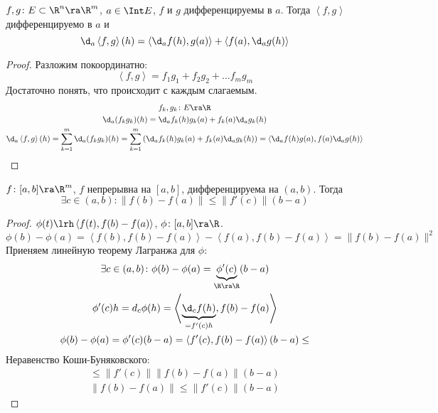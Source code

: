 \begin{theorem}
	$f, g\colon E \subset \R^n \ra \R^m$, $a \in \Int E$, $f$ и $g$ дифференцируемы в $a$.
	Тогда $\left<f, g\right>$ дифференцируемо в $a$ и
	\[ \d_a \left<f, g\right>(h) = \left<\d_a f(h), g(a)\right> + \left<f(a), \d_a g(h)\right>\]
\end{theorem}
\begin{proof}
	Разложим покоординатно:
	\[ \left<f, g\right> = f_1 g_1 + f_2 g_2 + \dots f_m g_m \]
	Достаточно понять, что происходит с каждым слагаемым.
	\begin{gather*}
		f_k, g_k\colon E \ra \R \\
		\d_a (f_k g_k)(h) = \d_a f_k(h) g_k(a) + f_k(a) \d_a g_k(h) \\
		\d_a \left<f, g\right>(h) = \sum_{k=1}^m \d_a (f_k g_k)(h) = \sum_{k=1}^m \left(\d_a f_k(h) g_k(a) + f_k(a) \d_a g_k(h)\right) =
			\left<\d_a f(h) g(a), f(a) \d_a g(h)\right>
	\end{gather*}
\end{proof}

\begin{theorem}
	$f\colon [a, b] \ra \R^m$, $f$ непрерывна на $[a, b]$, дифференцируема на $(a, b)$.
	Тогда
	\[ \exists c \in (a, b)\colon \|f(b) - f(a)\| \le \|f'(c)\| (b - a) \]
\end{theorem}
\begin{proof}
	$\phi(t) \lrh \left< f(t), f(b) - f(a) \right>$, $\phi\colon [a, b] \ra \R$.
	\[ \phi(b) - \phi(a) = \left< f(b), f(b) - f(a) \right> - \left< f(a), f(b) - f(a) \right> = \|f(b) - f(a)\|^2 \]
	Приеняем линейную теорему Лагранжа для $\phi$:
	\begin{gather*}
		\exists c\in(a, b)\colon \phi(b) - \phi(a) = \underbrace{\phi'(c)}_{\R \ra \R}(b - a) \\
		\phi'(c) h = d_c \phi(h) = \left<\underbrace{\d_c f(h)}_{=f'(c)h}, f(b) - f(a)\right> \\
		\phi(b) - \phi(a) = \phi'(c)(b - a) = \left<f'(c), f(b) - f(a)\right>(b-a) \le
	\end{gather*}
	Неравенство Коши-Буняковского:
	\begin{gather*}
		\le \|f'(c)\| \|f(b) - f(a)\| (b - a) \\
		\|f(b) - f(a)\| \le \|f'(c)\| (b - a)
	\end{gather*}
\end{proof}